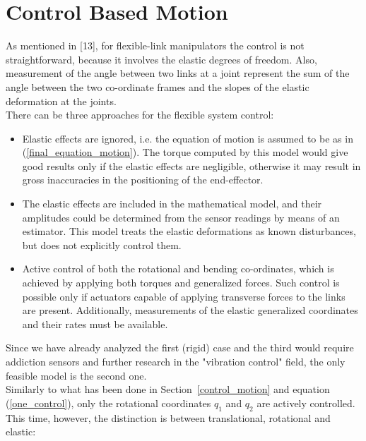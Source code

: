 \documentclass[a4paper,12pt,oneside]{report}
\begin{document}
\section{Control Based Motion}
As mentioned in [13], for flexible-link manipulators the control is not straightforward, because it involves the elastic degrees of freedom. Also, measurement of the angle between two links at a joint represent the sum of the angle between the two co-ordinate frames and the slopes of the elastic deformation at the joints.\\
There can be three approaches for the flexible system control:
\begin{itemize}
  \item Elastic effects are ignored, i.e. the equation of motion is assumed to be as in (\ref{final_equation_motion}). The torque computed by this model would give good results only if the elastic effects are
  negligible, otherwise it may result in gross inaccuracies in the positioning of the end-effector.
  \item The elastic effects are included in the mathematical model, and their amplitudes could be determined from the sensor readings by means of an estimator. This model treats the elastic deformations as known disturbances, but does not explicitly control them.
  \item Active control of both the rotational and bending co-ordinates, which is achieved by applying both torques and generalized forces. Such control is possible only if actuators capable of applying transverse forces to the links are present. Additionally, measurements of the elastic generalized coordinates and their rates must be available.
\end{itemize}
Since we have already analyzed the first (rigid) case and the third would require addiction sensors and further research in the "vibration control" field, the only feasible model is the second one.\\
Similarly to what has been done in Section~\ref{control_motion} and equation (\ref{one_control}), only the rotational coordinates $q_1$ and $q_2$ are actively controlled. This time, however, the distinction is between translational, rotational and elastic:
\end{document}
